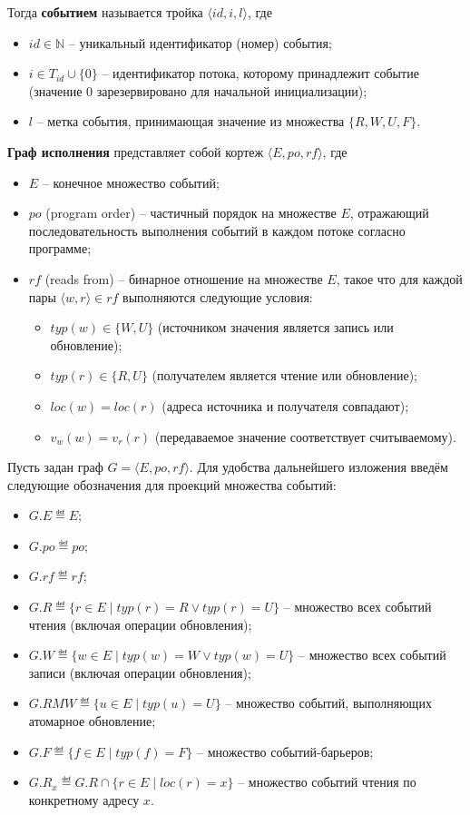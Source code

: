 Тогда \textbf{событием} называется тройка $\langle id, i, l \rangle$, где
\begin{itemize}
  \item $id \in \mathbb{N}$ -- уникальный идентификатор (номер) события;
  \item $i \in T_{id} \cup \{0\}$ -- идентификатор потока, которому
    принадлежит событие (значение $0$ зарезервировано для начальной
    инициализации);
  \item $l$ -- метка события, принимающая значение из множества $\{R,W,U,F\}$.
\end{itemize}

\textbf{Граф исполнения} представляет собой кортеж $\langle E, po, rf
\rangle$, где
\begin{itemize}
  \item $E$ -- конечное множество событий;
  \item $po$ (program order) -- частичный порядок на множестве $E$,
    отражающий последовательность выполнения событий в каждом потоке
    согласно программе;
  \item $rf$ (reads from) -- бинарное отношение на множестве $E$,
    такое что для каждой пары $\langle w, r \rangle \in rf$
    выполняются следующие условия:
    \begin{itemize}
      \item $typ(w) \in \{W,U\}$ (источником значения является запись
        или обновление);
      \item $typ(r) \in \{R,U\}$ (получателем является чтение или обновление);
      \item $loc(w)=loc(r)$ (адреса источника и получателя совпадают);
      \item $v_{w}(w) = v_{r}(r)$ (передаваемое значение
        соответствует считываемому).
    \end{itemize}
\end{itemize}

Пусть задан граф $G=\langle E, po, rf \rangle$. Для удобства
дальнейшего изложения введём следующие обозначения для проекций
множества событий:
\begin{itemize}
  \item $G.E \eqdef E$;
  \item $G.po \eqdef po$;
  \item $G.rf \eqdef rf$;
  \item $G.R \eqdef \{r \in E \mid typ(r) = R \vee typ(r) = U \}$ --
    множество всех событий чтения (включая операции обновления);
  \item $G.W \eqdef \{w \in E \mid typ(w) = W \vee typ(w) = U \}$ --
    множество всех событий записи (включая операции обновления);
  \item $G.RMW \eqdef \{u \in E \mid typ(u) = U \}$ -- множество
    событий, выполняющих атомарное обновление;
  \item $G.F \eqdef \{f \in E \mid typ(f) = F \}$ -- множество событий-барьеров;
  \item $G.R_{x} \eqdef G.R \cap \{r \in E \mid loc(r) = x\}$ --
    множество событий чтения по конкретному адресу $x$.
\end{itemize}

